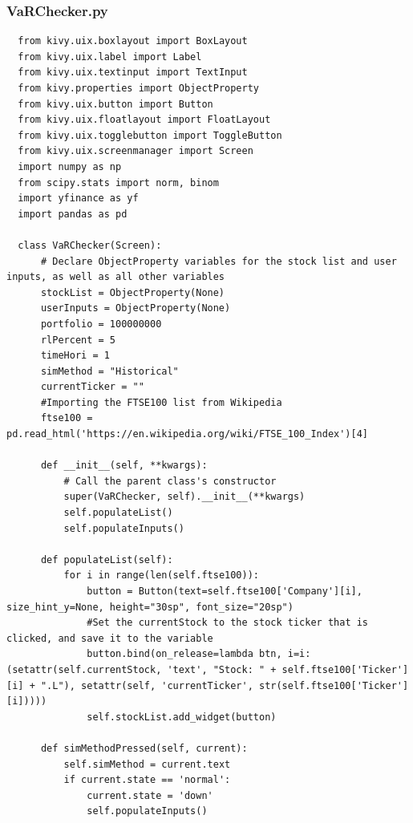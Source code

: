\documentclass{article}
\begin{document}
\subsubsection{VaRChecker.py}
\begin{verbatim}
  from kivy.uix.boxlayout import BoxLayout
  from kivy.uix.label import Label
  from kivy.uix.textinput import TextInput
  from kivy.properties import ObjectProperty
  from kivy.uix.button import Button
  from kivy.uix.floatlayout import FloatLayout
  from kivy.uix.togglebutton import ToggleButton
  from kivy.uix.screenmanager import Screen
  import numpy as np
  from scipy.stats import norm, binom
  import yfinance as yf
  import pandas as pd

  class VaRChecker(Screen):
      # Declare ObjectProperty variables for the stock list and user inputs, as well as all other variables
      stockList = ObjectProperty(None)
      userInputs = ObjectProperty(None)
      portfolio = 100000000
      rlPercent = 5
      timeHori = 1
      simMethod = "Historical"
      currentTicker = ""
      #Importing the FTSE100 list from Wikipedia
      ftse100 = pd.read_html('https://en.wikipedia.org/wiki/FTSE_100_Index')[4]

      def __init__(self, **kwargs):
          # Call the parent class's constructor
          super(VaRChecker, self).__init__(**kwargs)
          self.populateList()
          self.populateInputs()

      def populateList(self):
          for i in range(len(self.ftse100)):
              button = Button(text=self.ftse100['Company'][i], size_hint_y=None, height="30sp", font_size="20sp")
              #Set the currentStock to the stock ticker that is clicked, and save it to the variable
              button.bind(on_release=lambda btn, i=i: (setattr(self.currentStock, 'text', "Stock: " + self.ftse100['Ticker'][i] + ".L"), setattr(self, 'currentTicker', str(self.ftse100['Ticker'][i])))) 
              self.stockList.add_widget(button)

      def simMethodPressed(self, current):
          self.simMethod = current.text
          if current.state == 'normal':
              current.state = 'down'            
              self.populateInputs()
              

\end{verbatim}
\end{document}

